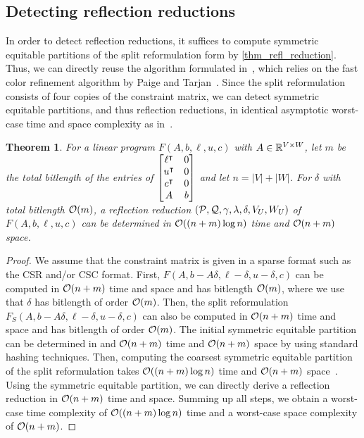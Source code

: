 \documentclass[pdflatex,sn-mathphys-num]{sn-jnl}%
\theoremstyle{thmstyleone}%
\newtheorem{theorem}[theorem]{Theorem}
\theoremstyle{thmstylethree}%
\theoremstyle{thmstyletwo}%
\begin{document}
\subsection{Detecting reflection reductions}
\label{sec_lp_algorithm}
In order to detect reflection reductions, it suffices to compute symmetric equitable partitions of the split reformulation form by \cref{thm_refl_reduction}. Thus, we can directly reuse the algorithm formulated in~\cite{Grohe2014}, which relies on the fast color refinement algorithm by Paige and Tarjan~\cite{Paige1987}. Since the split reformulation consists of four copies of the constraint matrix, we can detect symmetric equitable partitions, and thus reflection reductions, in identical asymptotic worst-case time and space complexity as in~\cite{Grohe2014}.

\begin{theorem}
\label{thm_running_time_extended} For a linear program $F(A,b,\ell,u,c)$ with $A\in \mathbb{R}^{V\times W}$, let $m$ be the total bitlength of the entries of $\begin{bmatrix}
    \ell^{\intercal} & 0 \\
    u^{\intercal} & 0 \\
    c^{\intercal} & 0\\
    A & b
\end{bmatrix}$ and let $n = |V| + |W|$. For $\delta$ with total bitlength $\orderO(m)$, a reflection reduction $(\mathcal{P},\mathcal{Q},\gamma,\lambda,\delta,V_U,W_U)$ of $F(A,b,\ell,u,c)$ can be determined in $\orderO((n+m)\log n)$ time and $\orderO(n+m)$ space.
\end{theorem}
\begin{proof}
    We assume that the constraint matrix is given in a sparse format such as the CSR and/or CSC format.
    First, $F(A,b- A \delta,\ell- \delta,u-\delta,c)$ can be computed in $\orderO(n+m)$ time and space and has bitlength $\orderO(m)$, where we use that $\delta$ has bitlength of order $\orderO(m)$. Then, the split reformulation $F_S(A,b- A \delta,\ell- \delta,u-\delta,c)$ can also be computed in $\orderO(n+m)$ time and space and has bitlength of order $\orderO(m)$. 
    The initial symmetric equitable partition can be determined in and $\orderO(n+m)$ time and $\orderO(n+m)$ space by using standard hashing techniques.
    Then, computing the coarsest symmetric equitable partition of the split reformulation takes $\orderO((n+m)\log n)$ time and $\orderO(n+m)$ space~\cite[Theorem 3.1]{Grohe2014}.
    Using the symmetric equitable partition, we can directly derive a reflection reduction in $\orderO(n+m)$ time and space. Summing up all steps, we obtain a worst-case time complexity of $\orderO((n+m)\log n)$ time and a worst-case space complexity of $\orderO(n+m)$. 
\end{proof}
\end{document}
